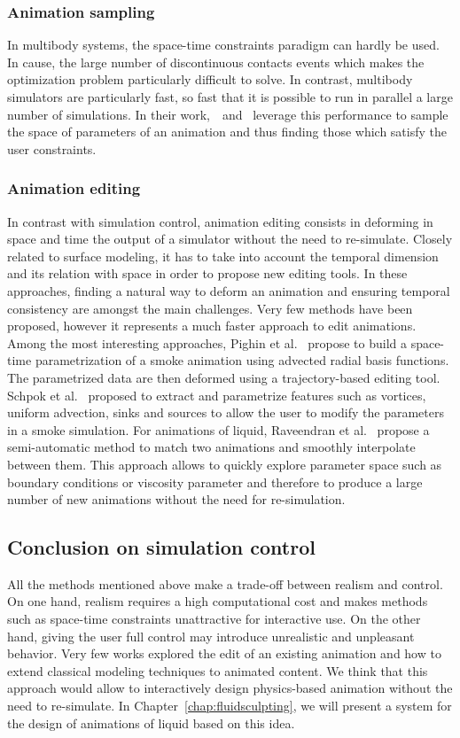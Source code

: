 \subsubsection{Animation sampling}
In multibody systems, the space-time constraints paradigm can hardly be used. In cause, the large number of discontinuous contacts events which makes the optimization problem particularly difficult to solve. In contrast, multibody simulators are particularly fast, so fast that it is possible to run in parallel a large number of simulations. In their work,~\cite{Chenney2000}~and~\cite{Twigg2007} leverage this performance to sample the space of parameters of an animation and thus finding those which satisfy the user constraints.

\subsubsection{Animation editing} 
In contrast with simulation control, animation editing consists in deforming in space and time the output of a simulator without the need to re-simulate.
Closely related to surface modeling, it has to take into account the temporal dimension and its relation with space in order to propose new editing tools. 
In these approaches, finding a natural way to deform an animation and ensuring temporal consistency are amongst the main challenges.
Very few methods have been proposed, however it represents a much faster approach to edit animations.
Among the most interesting approaches, Pighin et al.~\cite{Pighin2004} propose to build a space-time parametrization of a smoke animation using advected radial basis functions. The parametrized data are then deformed using a trajectory-based editing tool.
Schpok et al.~\cite{Schpok2005} proposed to extract and parametrize features such as vortices, uniform advection, sinks and sources to allow the user to modify the parameters in a smoke simulation.
For animations of liquid, Raveendran et al.~\cite{Raveendran2014} propose a semi-automatic method to match two animations and smoothly interpolate between them. 
This approach allows to quickly explore parameter space such as boundary conditions or viscosity parameter and therefore to produce a large number of new animations without the need for re-simulation.

\subsection{Conclusion on simulation control}

All the methods mentioned above make a trade-off between realism and control.
On one hand, realism requires a high computational cost and makes methods such as space-time constraints unattractive for interactive use.
On the other hand, giving the user full control may introduce unrealistic and unpleasant behavior.
Very few works explored the edit of an existing animation and how to extend classical modeling techniques to animated content.
We think that this approach would allow to interactively design physics-based animation without the need to re-simulate.
In Chapter~\ref{chap:fluidsculpting}, we will present a system for the design of animations of liquid based on this idea.
